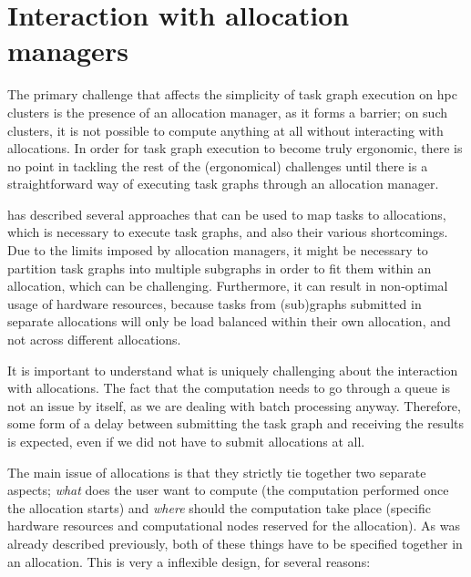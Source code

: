 

\section{Interaction with allocation managers}
The primary challenge that affects the simplicity of task graph execution on \gls{hpc}
clusters is the presence of an allocation manager, as it forms a barrier; on such clusters, it is
not possible to compute anything at all without interacting with allocations. In order for task
graph execution to become truly ergonomic, there is no point in tackling the rest of the
(ergonomical) challenges until there is a straightforward way of executing task graphs through an
allocation manager.

 has described several approaches that can be used to map tasks to
allocations, which is necessary to execute task graphs, and also their various shortcomings. Due to
the limits imposed by allocation managers, it might be necessary to partition task graphs into
multiple subgraphs in order to fit them within an allocation, which can be challenging.
Furthermore, it can result in non-optimal usage of hardware resources, because tasks from
(sub)graphs submitted in separate allocations will only be load balanced within their own
allocation, and not across different allocations.

It is important to understand what is uniquely challenging about the interaction with allocations.
The fact that the computation needs to go through a queue is not an issue by itself, as we are
dealing with batch processing anyway. Therefore, some form of a delay between submitting the task
graph and receiving the results is expected, even if we did not have to submit allocations at all.

The main issue of allocations is that they strictly tie together two separate aspects;
\emph{what} does the user want to compute (the computation performed once the allocation
starts) and \emph{where} should the computation take place (specific hardware resources
and computational nodes reserved for the allocation). As was already described previously, both of
these things have to be specified together in an allocation. This is very a inflexible design, for
several reasons:

